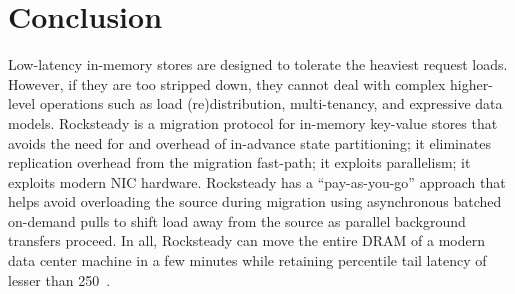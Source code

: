 \section{Conclusion}

Low-latency in-memory stores are designed to tolerate the heaviest request
loads. However, if they are too stripped down, they cannot deal with complex
higher-level operations such as load (re)distribution,
multi-tenancy, and expressive data models.
%
Rocksteady is a migration protocol for in-memory key-value stores that avoids
the need for and overhead of in-advance state partitioning; it eliminates
replication overhead from the migration fast-path; it exploits parallelism;
it exploits modern NIC hardware.  Rocksteady has a
``pay-as-you-go'' approach that helps avoid overloading the source during migration
using asynchronous batched on-demand pulls to shift load away from the source
as parallel background transfers proceed.  In all, Rocksteady can move the entire DRAM
of a modern data center machine in a few minutes while retaining \nnnth
percentile tail latency of lesser than 250~\us.
